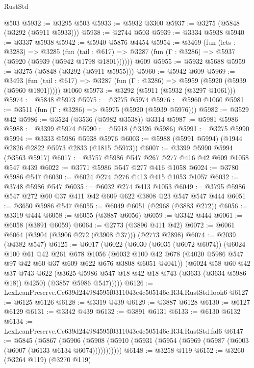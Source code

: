 \begin{lexlean}{RustStd}
\begin{coremodule}
    @503
@5932 := @3295 @503
@5933 := @5932 @3300
@5937 := @3275 (@5848 (@3292 (@5911 @5933)))
@5938 := @2744 @503
@5939 := @3334 @5938
@5940 := @3337 @5938
@5942 := @5940 @5876 @4454
@5954 := @3469
    (fun (lets : @3283) =>
    @3285
      (fun (tail : @617) => @3287 (fun (Γ : @3286) => @5937 (@5920 (@5939 (@5942 @1798 @1801))))))
    @609
@5955 := @5932 @5688
@5959 := @3275 (@5848 (@3292 (@5911 @5955)))
@5960 := @5942 @609
@5969 := @3493
    (fun (tail : @617) => @3287 (fun (Γ : @3286) => @5959 (@5920 (@5939 (@5960 @1801)))))
    @1060
@5973 := @3292 (@5911 (@5932 (@3297 @1061)))
@5974 := @5848 @5973
@5975 := @3275 @5974
@5976 := @5960 @1060
@5981 := @3511 (fun (Γ : @3286) => @5975 (@5920 (@5939 @5976)))
@5982 := @3529 @42
@5986 := @3524 (@3536 (@5982 @3538)) @3314
@5987 := @5981 @5986
@5988 := @3399 @5974
@5990 := @5918 (@3326 @5986)
@5991 := @3275 @5990
@5994 := @3333 @5986 @5938 @5976
@6003 := @5988 (@5991 @5994) (@1944 @2826 @2822 @5973 @2833 (@1815 @5973))
@6007 := @3399 @5990 @5994 (@3563 @5917)
@6017 := @3757 @5986 @547 @267 @277 @416 @42 @609 @1058 @547 @439
@6022 := @3771 @5986 @547 @277 @416 @1058
@6024 := @3780 @5986 @547
@6030 := @6024 @274 @276 @413 @415 @1053 @1057
@6032 := @3748 @5986 @547
@6035 := @6032 @274 @413 @1053
@6049 := @3795 @5986 @547 @272 @60 @37 @411 @42 @609 @622 @3808 @23 @547 @547 @444
@6051 := @3650 @5986 @547
@6055 := @6049 @6051 (@2968 (@3883 @272))
@6056 := @3319 @444
@6058 := @6055 (@3887 @6056)
@6059 := @3342 @444
@6061 := @6058 (@3891 @6059)
@6064 := @2773 (@3896 @411 @42)
@6072 := @6061 @6064 (@3904 (@3906 @272 (@3908 @37))) (@2773 @2898)
@6074 := @2039 (@4382 @547)
@6125 := @6017
    (@6022
      (@6030
        (@6035 (@6072 @6074))
        (@6024
          @100
          @61
          @42
          @261
          @678
          @1056
          (@6032 @100 @42 @678 (@4020 @5986 @547 @97 @42 @60 @37 @609 @622 @676 @3808 @6051 @4041))
          (@6024
            @58
            @60
            @42
            @37
            @743
            @622
            (@3625 @5986 @547 @18 @42 @18 @743 (@3633 (@3634 @5986 @18)) @4250)
            (@3857 @5986 @547)))))
@6126 := LexLeanPreserve.Cc639d244984595f0311043c4c505146e.R34.RustStd.look6
@6127 := @6125 @6126
@6128 := @3319 @439
@6129 := @3887 @6128
@6130 := @6127 @6129
@6131 := @3342 @439
@6132 := @3891 @6131
@6133 := @6130 @6132
@6134 := LexLeanPreserve.Cc639d244984595f0311043c4c505146e.R34.RustStd.fal6
@6147 := @5845
    (@5867
      (@5906 (@5908 (@5910 (@5931 (@5954 (@5969 (@5987 (@6003 (@6007 (@6133 @6134 @6074)))))))))))
@6148 := @3258 @119
@6152 := @3260 (@3264 @119) (@3270 @119)

\end{coremodule}
\end{lexlean}
